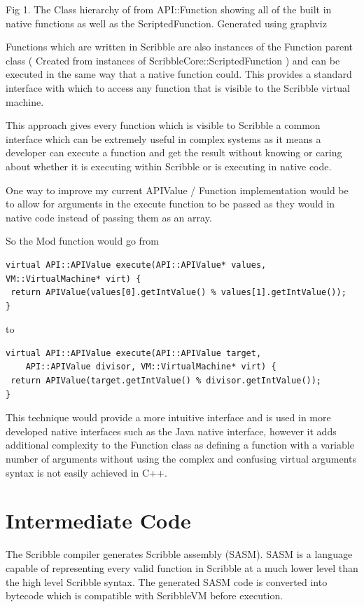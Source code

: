 \documentclass[]{final_report}
\begin{document}
Fig 1. The Class hierarchy of from API::Function showing all of the built in native functions as well as the ScriptedFunction. Generated using graphviz

Functions which are written in Scribble are also instances of the Function parent class ( Created from instances of ScribbleCore::ScriptedFunction ) and can be executed in the same way that a native function could. This provides a standard interface with which to access any function that is visible to the Scribble virtual machine.

This approach gives every function which is visible to Scribble a common interface which can be extremely useful in complex systems as it means a developer can execute a function and get the result without knowing or caring about whether it is executing within Scribble or is executing in native code.

One way to improve my current APIValue / Function implementation would be to allow for arguments in the execute function to be passed as they would in native code instead of passing them as an array.

So the Mod function would go from
\begin{verbatim}
virtual API::APIValue execute(API::APIValue* values, VM::VirtualMachine* virt) {
 return APIValue(values[0].getIntValue() % values[1].getIntValue());
}
\end{verbatim}
to
\begin{verbatim}
virtual API::APIValue execute(API::APIValue target, 
    API::APIValue divisor, VM::VirtualMachine* virt) {
 return APIValue(target.getIntValue() % divisor.getIntValue());
}
\end{verbatim}

This technique would provide a more intuitive interface and is used in more developed native interfaces such as the Java native interface, however it adds additional complexity to the Function class as defining a function with a variable number of arguments without using the complex and confusing virtual arguments syntax is not easily achieved in C++.

\chapter{Intermediate Code}

The Scribble compiler generates Scribble assembly (SASM). SASM is a language capable of representing every valid function in Scribble at a much lower level than the high level Scribble syntax. The generated SASM code is converted into bytecode which is compatible with ScribbleVM before execution.
\end{document}
